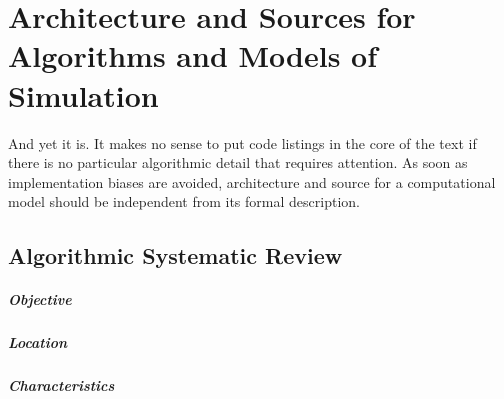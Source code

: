 


\chapter{Architecture and Sources for Algorithms and Models of Simulation} %

\label{app:code} %









And yet it is. It makes no sense to put code listings in the core of the text if there is no particular algorithmic detail that requires attention. As soon as implementation biases are avoided, architecture and source for a computational model should be independent from its formal description.



\newpage

\section{Algorithmic Systematic Review}

\paragraph{Objective}


\paragraph{Location}


\paragraph{Characteristics}

